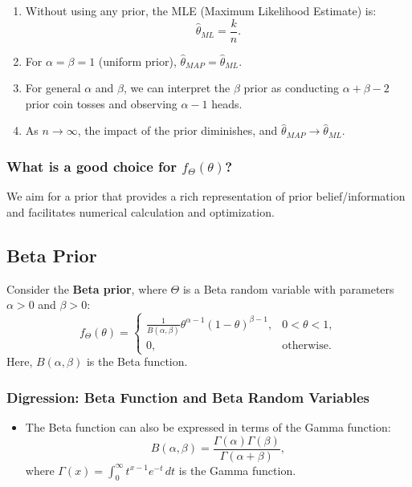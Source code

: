 \begin{notes}
    \begin{enumerate}
        \item Without using any prior, the MLE (Maximum Likelihood Estimate) is:
        \[
        \hat{\theta}_{ML} = \frac{k}{n}.
        \]
        \item For $\alpha = \beta = 1$ (uniform prior), $\hat{\theta}_{MAP} = \hat{\theta}_{ML}$.
        \item For general $\alpha$ and $\beta$, we can interpret the $\beta$ prior as conducting $\alpha + \beta -2$ prior coin tosses and observing $\alpha - 1$ heads.
        \item As $n \to \infty$, the impact of the prior diminishes, and $\hat{\theta}_{MAP} \to \hat{\theta}_{ML}$.
    \end{enumerate}
\end{notes}

\subsubsection{What is a good choice for $f_\Theta(\theta)$?}
\begin{motivation}
    We aim for a prior that provides a rich representation of prior belief/information and facilitates numerical calculation and optimization.
\end{motivation}

\subsection{Beta Prior}
\begin{definition}
    Consider the \textbf{Beta prior}, where $\Theta$ is a Beta random variable with parameters $\alpha > 0$ and $\beta > 0$:
        \[
        f_\Theta(\theta) = 
        \begin{cases} 
        \frac{1}{B(\alpha, \beta)} \theta^{\alpha-1} (1-\theta)^{\beta-1}, & 0 < \theta < 1, \\
        0, & \text{otherwise}.
        \end{cases}
        \]
        Here, $B(\alpha, \beta)$ is the Beta function. 
\end{definition}

\subsubsection{Digression: Beta Function and Beta Random Variables}
\begin{definition}
    \begin{itemize}
        \item The Beta function can also be expressed in terms of the Gamma function:
        \[
        B(\alpha, \beta) = \frac{\Gamma(\alpha) \Gamma(\beta)}{\Gamma(\alpha + \beta)},
        \]
        where $\Gamma(x) = \int_0^\infty t^{x-1} e^{-t} \, dt$ is the Gamma function.
    \end{itemize}
\end{definition}

